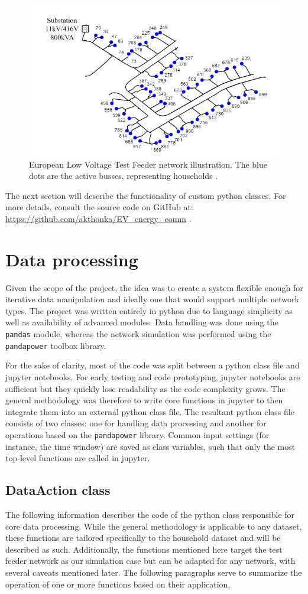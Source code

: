 \documentclass[a4paper,10pt]{report}
\begin{document}
\begin{figure}[htpb]
	\centering
	\includegraphics[width=0.6\linewidth]{EU_LV_test_feeder}
	\caption[European Low Voltage Test Feeder layout]{European Low Voltage Test Feeder network illustration. The blue dots are the active busses, representing households \cite{Nousdilis2017}.}
	\label{EU_LV_test_feeder}
\end{figure}

The next section will describe the functionality of custom python classes. For more details, consult the source code on GitHub at: \url{https://github.com/akthonka/EV_energy_comm} .

\newpage
\section{Data processing}\label{section_data_processing}
Given the scope of the project, the idea was to create a system flexible enough for iterative data manipulation and ideally one that would support multiple network types. The project was written entirely in python due to language simplicity as well as availability of advanced modules. Data handling was done using the \texttt{pandas} module, whereas the network simulation was performed using the \texttt{pandapower} toolbox library.

For the sake of clarity, most of the code was split between a python class file and jupyter notebooks. For early testing and code prototyping, jupyter notebooks are sufficient but they quickly lose readability as the code complexity grows. The general methodology was therefore to write core functions in jupyter to then integrate them into an external python class file. The resultant python class file consists of two classes: one for handling data processing and another for operations based on the \texttt{pandapower} library. Common input settings (for instance, the time window) are saved as class variables, such that only the most top-level functions are called in jupyter.

\subsection{DataAction class}
The following information describes the code of the python class responsible for core data processing. While the general methodology is applicable to any dataset, these functions are tailored specifically to the household dataset and will be described as such. Additionally, the functions mentioned here target the test feeder network as our simulation case but can be adapted for any network, with several caveats mentioned later. The following paragraphs serve to summarize the operation of one or more functions based on their application.
\end{document}
